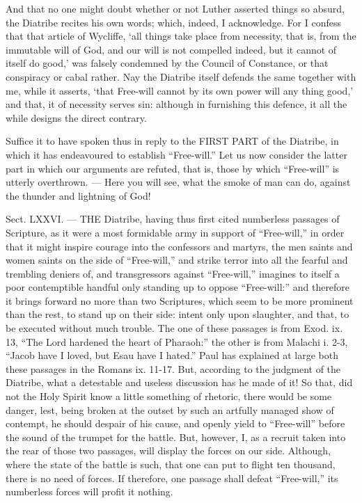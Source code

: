 And that no one might doubt whether or not Luther asserted things so absurd, the Diatribe recites his own words; which, indeed, I acknowledge. For I confess that that article of Wycliffe, ‘all things take place from necessity, that is, from the immutable will of God, and our will is not compelled indeed, but it cannot of itself do good,’ was falsely condemned by the Council of Constance, or that conspiracy or cabal rather. Nay the Diatribe itself defends the same together with me, while it asserts, ‘that Free-will cannot by its own power will any thing good,’ and that, it of necessity serves sin: although in furnishing this defence, it all the while designs the direct contrary.

Suffice it to have spoken thus in reply to the \textsc{FIRST PART} of the Diatribe, in which it has endeavoured to establish “Free-will.” Let us now consider the latter part in which our arguments are refuted, that is, those by which “Free-will” is utterly overthrown. — Here you will see, what the smoke of man can do, against the thunder and lightning of God!



Sect. LXXVI. — THE Diatribe, having thus first cited numberless passages of Scripture, as it were a most formidable army in support of “Free-will,” in order that it might inspire courage into the confessors and martyrs, the men saints and women saints on the side of “Free-will,” and strike terror into all the fearful and trembling deniers of, and transgressors against “Free-will,” imagines to itself a poor contemptible handful only standing up to oppose “Free-will:” and therefore it brings forward no more than two Scriptures, which seem to be more prominent than the rest, to stand up on their side: intent only upon slaughter, and that, to be executed without much trouble. The one of these passages is from Exod. ix. 13, “The Lord hardened the heart of Pharaoh:” the other is from Malachi i. 2-3, “Jacob have I loved, but Esau have I hated.” Paul has explained at large both these passages in the Romans ix. 11-17. But, according to the judgment of the Diatribe, what a detestable and useless discussion has he made of it! So that, did not the Holy Spirit know a little something of rhetoric, there would be some danger, lest, being broken at the outset by such an artfully managed show of contempt, he should despair of his cause, and openly yield to “Free-will” before the sound of the trumpet for the battle. But, however, I, as a recruit taken into the rear of those two passages, will display the forces on our side. Although, where the state of the battle is such, that one can put to flight ten thousand, there is no need of forces. If therefore, one passage shall defeat “Free-will,” its numberless forces will profit it nothing.

